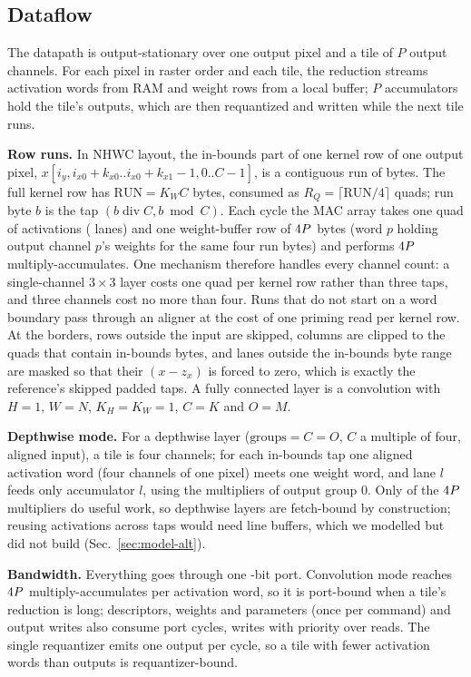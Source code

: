 \documentclass[journal]{IEEEtran}
\begin{document}
\subsection{Dataflow}
The datapath is output-stationary over one output pixel and a tile of $P$ output channels. For each pixel in raster order and each tile, the reduction streams activation words from RAM and weight rows from a local buffer; $P$ accumulators hold the tile's outputs, which are then requantized and written while the next tile runs.

\textbf{Row runs.} In NHWC layout, the in-bounds part of one kernel row of one output pixel, $x[i_y, i_{x0}{+}k_{x0} .. i_{x0}{+}k_{x1}{-}1, 0..C{-}1]$, is a contiguous run of bytes. The full kernel row has $\mathrm{RUN} = K_W C$ bytes, consumed as $R_Q=\lceil \mathrm{RUN}/4\rceil$ quads; run byte $b$ is the tap $(b \operatorname{div} C, b \bmod C)$. Each cycle the MAC array takes one quad of activations (\Lanes{} lanes) and one weight-buffer row of $4 P$ bytes (word $p$ holding output channel $p$'s weights for the same four run bytes) and performs $4 P$ multiply-accumulates. One mechanism therefore handles every channel count: a single-channel $3\times3$ layer costs one quad per kernel row rather than three taps, and three channels cost no more than four. Runs that do not start on a word boundary pass through an aligner at the cost of one priming read per kernel row. At the borders, rows outside the input are skipped, columns are clipped to the quads that contain in-bounds bytes, and lanes outside the in-bounds byte range are masked so that their $(x - z_x)$ is forced to zero, which is exactly the reference's skipped padded taps. A fully connected layer is a convolution with $H=1$, $W=N$, $K_H=K_W=1$, $C=K$ and $O=M$.

\textbf{Depthwise mode.} For a depthwise layer ($\text{groups}=C=O$, $C$ a multiple of four, aligned input), a tile is four channels; for each in-bounds tap one aligned activation word (four channels of one pixel) meets one weight word, and lane $l$ feeds only accumulator $l$, using the multipliers of output group 0. Only \Lanes{} of the $4 P$ multipliers do useful work, so depthwise layers are fetch-bound by construction; reusing activations across taps would need line buffers, which we modelled but did not build (Sec.~\ref{sec:model-alt}).

\textbf{Bandwidth.} Everything goes through one \PortBits-bit port. Convolution mode reaches $4 P$ multiply-accumulates per activation word, so it is port-bound when a tile's reduction is long; descriptors, weights and parameters (once per command) and output writes also consume port cycles, writes with priority over reads. The single requantizer emits one output per cycle, so a tile with fewer activation words than outputs is requantizer-bound.
\end{document}
